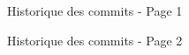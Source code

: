 \documentclass [a4 paper,11pt]{report}
\begin{document}
\begin{center}

  \begin{figure}[h!]
  \noindent{}
  \caption{Historique des commits - Page 1}
  \end{figure}

  \begin{figure}[h!]
  \noindent{}
  \caption{Historique des commits - Page 2}
  \end{figure}


\end{center}
\end{document}
